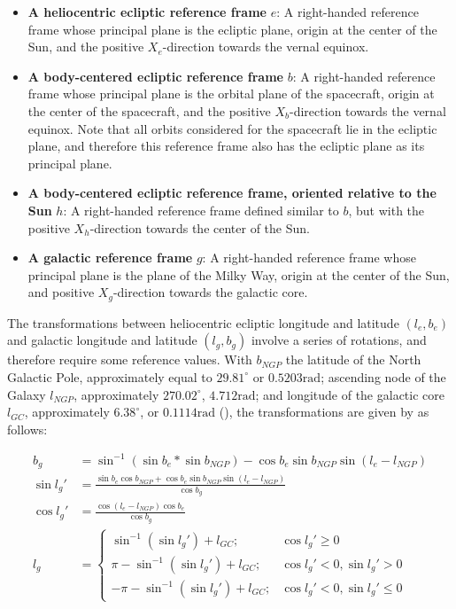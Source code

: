 \begin{itemize}
 \item \textbf{A heliocentric ecliptic reference frame} $e$: A right-handed reference frame whose principal plane is the ecliptic plane, origin at the center of the Sun, and the positive $X_e$-direction towards the vernal equinox.
 \item \textbf{A body-centered ecliptic reference frame} $b$: A right-handed reference frame whose principal plane is the orbital plane of the spacecraft, origin at the center of the spacecraft, and the positive $X_b$-direction towards the vernal equinox. Note that all orbits considered for the spacecraft lie in the ecliptic plane, and therefore this reference frame also has the ecliptic plane as its principal plane.
 \item \textbf{A body-centered ecliptic reference frame, oriented relative to the Sun} $h$: A right-handed reference frame defined similar to $b$, but with the positive $X_h$-direction towards the center of the Sun.
 \item \textbf{A galactic reference frame} $g$: A right-handed reference frame whose principal plane is the plane of the Milky Way, origin at the center of the Sun, and positive $X_g$-direction towards the galactic core.
\end{itemize}


The transformations between heliocentric ecliptic longitude and latitude $(l_e, b_e)$ and galactic longitude and latitude $(l_g, b_g)$ involve a series of rotations, and therefore require some reference values. With $b_{NGP}$ the latitude of the North Galactic Pole, approximately equal to $29.81^\circ$ or $0.5203 \mathrm{rad}$; ascending node of the Galaxy $l_{NGP}$, approximately $270.02^\circ$, $4.712 \mathrm{rad}$; and longitude of the galactic core $l_{GC}$, approximately $6.38^\circ$, or $0.1114 \mathrm{rad}$ (\cite{SkyBrightness}), the transformations are given by \cite{SkyBrightness} as follows:

\begin{align}
 b_g &= \sin ^{-1} (\sin b_e * \sin b_{NGP}) - \cos b_e \sin b_{NGP} \sin (l_e - l_{NGP}) \\
 \sin l_g' &= \frac{\sin b_e \cos b_{NGP} + \cos b_e \sin b_{NGP} \sin (l_e - l_{NGP})}{\cos b_g} \\
 \cos l_g' &= \frac{\cos (l_e - l_{NGP}) \cos b_e}{\cos b_g} \\
 l_g &= \begin{cases}
        \sin ^{-1} (\sin l_g') + l_{GC}; & \cos l_g' \geq 0 \\
        \pi - \sin^{-1} (\sin l_g') + l_{GC}; & \cos l_g' < 0, \sin l_g' > 0 \\
        - \pi - \sin^{-1} (\sin l_g') + l_{GC}; & \cos l_g' < 0, \sin l_g' \leq 0
       \end{cases}
\end{align}

